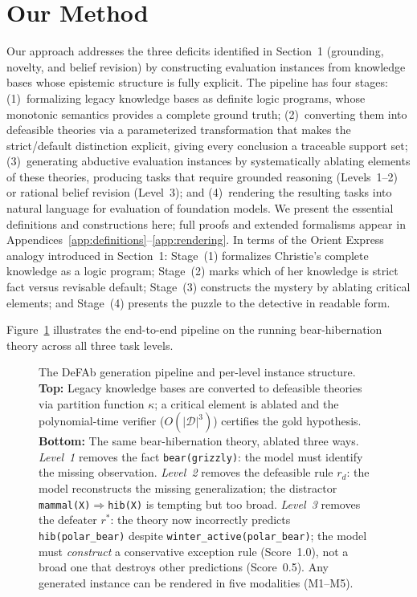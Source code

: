 \documentclass{article}
\theoremstyle{definition}
\newcommand{\D}{\mathcal{D}}
\begin{document}
\section{Our Method}\label{sec:method}

Our approach addresses the three deficits identified in Section~1 (grounding, novelty, and belief revision) by constructing evaluation instances from knowledge bases whose epistemic structure is fully explicit. The pipeline has four stages: (1)~formalizing legacy knowledge bases as definite logic programs, whose monotonic semantics provides a complete ground truth; (2)~converting them into defeasible theories via a parameterized transformation that makes the strict/default distinction explicit, giving every conclusion a traceable support set; (3)~generating abductive evaluation instances by systematically ablating elements of these theories, producing tasks that require grounded reasoning (Levels~1--2) or rational belief revision (Level~3); and (4)~rendering the resulting tasks into natural language for evaluation of foundation models. We present the essential definitions and constructions here; full proofs and extended formalisms appear in Appendices~\ref{app:definitions}--\ref{app:rendering}. In terms of the Orient Express analogy introduced in Section~1: Stage~(1) formalizes Christie's complete knowledge as a logic program; Stage~(2) marks which of her knowledge is strict fact versus revisable default; Stage~(3) constructs the mystery by ablating critical elements; and Stage~(4) presents the puzzle to the detective in readable form.


Figure~\ref{fig:pipeline} illustrates the end-to-end pipeline on the running bear-hibernation theory across all three task levels.

\begin{figure}[t]
\centering
\resizebox{\textwidth}{!}{}
\caption{The DeFAb generation pipeline and per-level instance structure. \textbf{Top:} Legacy knowledge bases are converted to defeasible theories via partition function $\kappa$; a critical element is ablated and the polynomial-time verifier ($O(|\D|^3)$) certifies the gold hypothesis. \textbf{Bottom:} The same bear-hibernation theory, ablated three ways. \emph{Level~1} removes the fact \texttt{bear(grizzly)}: the model must identify the missing observation. \emph{Level~2} removes the defeasible rule $r_d$: the model reconstructs the missing generalization; the distractor \texttt{mammal(X)$\Rightarrow$hib(X)} is tempting but too broad. \emph{Level~3} removes the defeater $r^*$: the theory now incorrectly predicts \texttt{hib(polar\_bear)} despite \texttt{winter\_active(polar\_bear)}; the model must \emph{construct} a conservative exception rule (Score~1.0), not a broad one that destroys other predictions (Score~0.5). Any generated instance can be rendered in five modalities (M1--M5).}
\label{fig:pipeline}
\end{figure}
\end{document}
